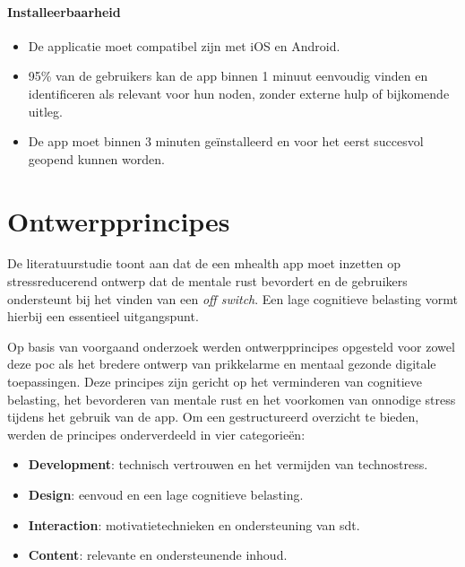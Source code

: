 \vspace{1em}

\paragraph{Installeerbaarheid}
\vspace{1em}

\begin{itemize}
    \item De applicatie moet compatibel zijn met iOS en Android.
    \item 95\% van de gebruikers kan de app binnen 1 minuut eenvoudig vinden en \newline identificeren als relevant voor hun noden, zonder externe hulp of \newline bijkomende uitleg.
    \item De app moet binnen 3 minuten geïnstalleerd en voor het eerst succesvol geopend kunnen worden.
\end{itemize}

\newpage




\section{Ontwerpprincipes}
\label{sec:ontwerpprincipes}

\vspace{1em}

De literatuurstudie toont aan dat de een \acrshort{mhealth} app moet inzetten op stressreducerend ontwerp dat de mentale rust bevordert en de gebruikers ondersteunt bij het vinden van een \textit{off switch}. Een lage cognitieve belasting vormt hierbij een essentieel uitgangspunt. 

\vspace{1em}

Op basis van voorgaand onderzoek werden ontwerpprincipes opgesteld voor zowel deze \acrshort{poc} als het bredere ontwerp van prikkelarme en mentaal gezonde digitale toepassingen. Deze principes zijn gericht op het verminderen van cognitieve belasting, het bevorderen van mentale rust en het voorkomen van onnodige stress tijdens het gebruik van de app. Om een gestructureerd overzicht te bieden, werden de principes onderverdeeld in vier categorieën:

\vspace{1em}

\begin{itemize}[nosep]
    \item \textbf{Development}: technisch vertrouwen en het vermijden van technostress.
    \item \textbf{Design}: eenvoud en een lage cognitieve belasting.
    \item \textbf{Interaction}: motivatietechnieken en ondersteuning van \acrshort{sdt}.
    \item \textbf{Content}: relevante en ondersteunende inhoud.
\end{itemize}

